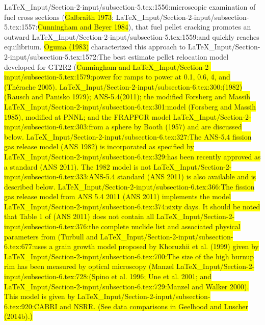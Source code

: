 {{{{{{LaTeX_Input/Section-2-input/subsection-5.tex:1556:microscopic examination of fuel cross sections (\colorbox{yellow}{Galbraith 1973};
LaTeX_Input/Section-2-input/subsection-5.tex:1557:\colorbox{yellow}{Cunningham and Beyer 1984}), that fuel pellet cracking promotes an outward
LaTeX_Input/Section-2-input/subsection-5.tex:1559:and quickly reaches equilibrium. \colorbox{yellow}{Oguma (1983)} characterized this approach to
LaTeX_Input/Section-2-input/subsection-5.tex:1572:The best estimate pellet relocation model developed for GT2R2 (\colorbox{yellow}{Cunningham and
LaTeX_Input/Section-2-input/subsection-5.tex:1579:power for ramps to power at 0.1, 0.6, 4, and  (\colorbox{yellow}{Thérache 2005}).
LaTeX_Input/Section-2-input/subsection-6.tex:300:(1982) (\colorbox{yellow}{Rausch and Panisko 1979}); ANS-5.4(2011); the modified Forsberg and Massih
LaTeX_Input/Section-2-input/subsection-6.tex:301:model (\colorbox{yellow}{Forsberg and Massih 1985}), modified at PNNL; and the FRAPFGR model
LaTeX_Input/Section-2-input/subsection-6.tex:303:from a sphere by \colorbox{yellow}{Booth (1957)} and are discussed below.
LaTeX_Input/Section-2-input/subsection-6.tex:327:The ANS-5.4 fission gas release model (\colorbox{yellow}{ANS 1982}) is incorporated as specified by
LaTeX_Input/Section-2-input/subsection-6.tex:329:has been recently approved as a standard (\colorbox{yellow}{ANS 2011}). The 1982 model is not
LaTeX_Input/Section-2-input/subsection-6.tex:333:ANS-5.4 standard (\colorbox{yellow}{ANS 2011}) is also available and is described below.
LaTeX_Input/Section-2-input/subsection-6.tex:366:The fission gas release model from ANS 5.4 2011 (\colorbox{yellow}{ANS 2011}) implements the model
LaTeX_Input/Section-2-input/subsection-6.tex:374:sixty days. It should be noted that Table 1 of (\colorbox{yellow}{ANS 2011}) does not contain all
LaTeX_Input/Section-2-input/subsection-6.tex:376:the complete nuclide list and associated physical parameters from (\colorbox{yellow}{Turbull and
LaTeX_Input/Section-2-input/subsection-6.tex:677:uses a grain growth model proposed by \colorbox{yellow}{Khoruzhii et al. (1999)} given by
LaTeX_Input/Section-2-input/subsection-6.tex:700:The size of the high burnup rim has been measured by optical microscopy (\colorbox{yellow}{Manzel
LaTeX_Input/Section-2-input/subsection-6.tex:728:(\colorbox{yellow}{Spino et al. 1996}; \colorbox{yellow}{Une et al.  2001}; and
LaTeX_Input/Section-2-input/subsection-6.tex:729:\colorbox{yellow}{Manzel and Walker 2000}). This model is given by
LaTeX_Input/Section-2-input/subsection-6.tex:920:CABRI and NSRR. (See data comparisons in \colorbox{yellow}{Geelhood and Luscher (2014b)}.)
}}}}}}}}}
